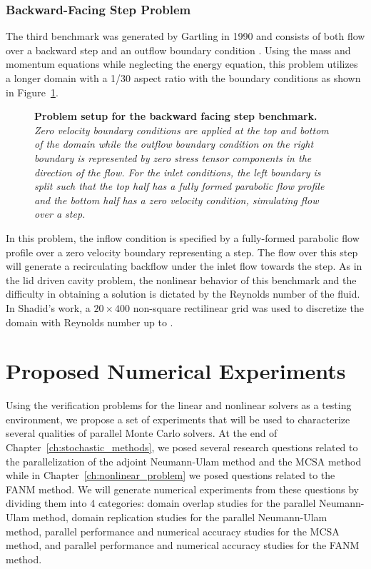 \subsubsection{Backward-Facing Step Problem}
\label{subsubsec:backward_facing_step}
The third benchmark was generated by Gartling in 1990 and consists of
both flow over a backward step and an outflow boundary condition
\citep{gartling_test_1990}. Using the mass and momentum equations
while neglecting the energy equation, this problem utilizes a longer
domain with a 1/30 aspect ratio with the boundary conditions as shown
in Figure~\ref{fig:backward_facing_step}.
\begin{figure}[htpb!]
  \begin{center}
    \scalebox{1.3}{
       }
  \end{center}
  \caption{\textbf{Problem setup for the backward facing step
      benchmark.} \textit{Zero velocity boundary conditions are
      applied at the top and bottom of the domain while the outflow
      boundary condition on the right boundary is represented by zero
      stress tensor components in the direction of the flow. For the
      inlet conditions, the left boundary is split such that the top
      half has a fully formed parabolic flow profile and the bottom
      half has a zero velocity condition, simulating flow over a
      step.}}
  \label{fig:backward_facing_step}
\end{figure}
In this problem, the inflow condition is specified by a fully-formed
parabolic flow profile over a zero velocity boundary representing a
step. The flow over this step will generate a recirculating backflow
under the inlet flow towards the step. As in the lid driven cavity
problem, the nonlinear behavior of this benchmark and the difficulty
in obtaining a solution is dictated by the Reynolds number of the
fluid. In Shadid's work, a $20 \times 400$ non-square rectilinear grid
was used to discretize the domain with Reynolds number up to
.

\section{Proposed Numerical Experiments}
\label{sec:numerical_experiments}
Using the verification problems for the linear and nonlinear solvers
as a testing environment, we propose a set of experiments that will be
used to characterize several qualities of parallel Monte Carlo
solvers. At the end of Chapter~\ref{ch:stochastic_methods}, we posed
several research questions related to the parallelization of the
adjoint Neumann-Ulam method and the MCSA method while in
Chapter~\ref{ch:nonlinear_problem} we posed questions related to the
FANM method. We will generate numerical experiments from these
questions by dividing them into 4 categories: domain overlap studies
for the parallel Neumann-Ulam method, domain replication studies for
the parallel Neumann-Ulam method, parallel performance and numerical
accuracy studies for the MCSA method, and parallel performance and
numerical accuracy studies for the FANM method.

